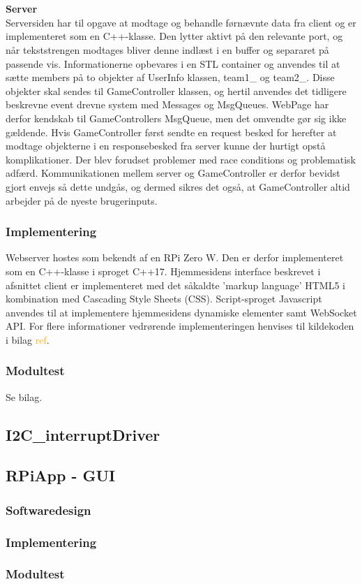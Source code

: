\documentclass[Rapport/Rapport_main.tex]{subfiles}
\begin{document}
\\\\\textbf{Server}
\\Serversiden har til opgave at modtage og behandle førnævnte data fra client og er implementeret som en C++-klasse. Den lytter aktivt på den relevante port, og når tekststrengen modtages bliver denne indlæst i en buffer og separaret på passende vis. Informationerne opbevares i en STL container og anvendes til at sætte members på to objekter af UserInfo klassen, team1\_ og team2\_. Disse objekter skal sendes til GameController klassen, og hertil anvendes det tidligere beskrevne event drevne system med Messages og MsgQueues. WebPage har derfor kendskab til GameControllers MsgQueue, men det omvendte gør sig ikke gældende. Hvis GameController først sendte en request besked for herefter at modtage objekterne i en responsebesked fra server kunne der hurtigt opstå komplikationer. Der blev forudset problemer med race conditions og problematisk adfærd. Kommunikationen mellem server og GameController er derfor bevidst gjort envejs så dette undgås, og dermed sikres det også, at GameController altid arbejder på de nyeste brugerinputs.

\subsubsection{Implementering}
Webserver hostes som bekendt af en RPi Zero W. Den er derfor implementeret som en C++-klasse i sproget C++17. Hjemmesidens interface beskrevet i afsnittet client er implementeret med det såkaldte 'markup language' HTML5 i kombination med Cascading Style Sheets (CSS). Script-sproget Javascript anvendes til at implementere hjemmesidens dynamiske elementer samt WebSocket API. For flere informationer vedrørende implementeringen henvises til kildekoden i bilag \textcolor{orange}{ref}.

\subsubsection{Modultest}
Se bilag.

\subsection{I2C\_interruptDriver}




\subsection{RPiApp - GUI}
\subsubsection{Softwaredesign}
\subsubsection{Implementering}
\subsubsection{Modultest}
\end{document}
